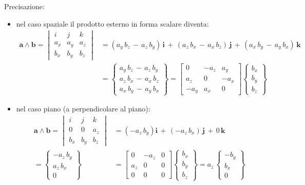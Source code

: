 		Precisazione: 
		\begin{itemize}
			\item nel caso spaziale il prodotto esterno in forma scalare diventa:
				\begin{align*}
					\mathbf{a}\wedge\mathbf{b} = 
					\begin{vmatrix}
						i & j & k\\
						a_x & a_y & a_z\\
						b_x & b_y & b_z
					\end{vmatrix}
					&=
					(a_y \, b_z \,-\,a_z \, b_y)\,\mathbf{i}\, +\, (a_z \, b_x \,-\,a_x \, b_z)\,\mathbf{j}\,+	\,(a_x \, b_y \,-\,a_y \, b_x)\,\mathbf{k}\\
					&=	\begin{Bmatrix}
						a_y \, b_z \,-\,a_z \, b_y\\
						a_z \, b_x \,-\,a_x \, b_z\\
						a_x \, b_y \,-\,a_y \, b_x
					\end{Bmatrix}	
					=
					\begin{bmatrix}
					0 & -a_z & a_y\\
					a_z & 0 & -a_x\\
					-a_y & a_x & 0
					\end{bmatrix}
					\begin{Bmatrix}
					b_x\\
					b_y\\
					b_z
					\end{Bmatrix}				
				\end{align*}
				
			\item nel caso piano (a perpendicolare al piano):
				\begin{align*}
					\mathbf{a}\wedge\mathbf{b} = 
					\begin{vmatrix}
						i & j & k\\
						0 & 0 & a_z\\
						b_x & b_y & b_z
					\end{vmatrix}
					&=
					(-a_z\,b_y)\mathbf{i}\, +\, (-a_z \, b_x)\,\mathbf{j}\,+ \,0\,\mathbf{k}\\
					=	\begin{Bmatrix}
						-a_z\,b_y \\
						a_z \, b_x\\
						0
					\end{Bmatrix}	
					&=
					\begin{bmatrix}
						0 & -a_z & 0\\
						a_z & 0 & 0\\
						0 & 0 & 0
					\end{bmatrix}
					\begin{Bmatrix}
					b_x\\
					b_y\\
					b_z
					\end{Bmatrix}
					=
					a_z\,
					\begin{Bmatrix}
						-b_y\\
						b_x\\
						0
					\end{Bmatrix}
				\end{align*}
		\end{itemize}